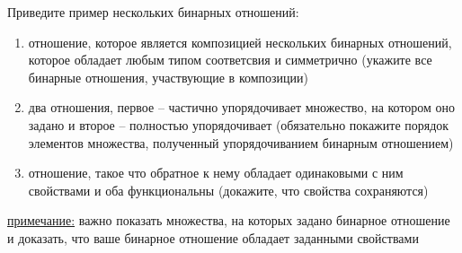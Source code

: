 \question
Приведите  пример  нескольких бинарных отношений:
\begin{enumerate}
	\renewcommand{\labelenumi}{\alph{enumi})}
	\item отношение, которое является композицией нескольких бинарных отношений,  которое  обладает любым типом соответсвия  и симметрично (укажите все бинарные отношения, участвующие в композиции)
	\item два отношения, первое -- частично упорядочивает множество, на котором оно задано и второе -- полностью упорядочивает (обязательно покажите порядок элементов множества, полученный упорядочиванием бинарным отношением)
	\item отношение, такое что обратное к нему обладает одинаковыми с ним свойствами и оба функциональны (докажите, что свойства сохраняются)
\end{enumerate}

\underline{примечание:} важно показать  множества, на которых задано бинарное отношение и доказать, что ваше бинарное отношение обладает заданными свойствами
